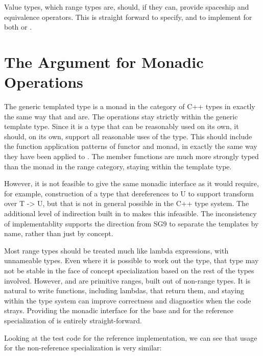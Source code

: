 \documentclass[a4paper,10pt,oneside,openany,final,article]{memoir}
\begin{document}
Value types, which range types are, should, if they can, provide spaceship and equivalence operators. This is straight forward to specify, and to implement for both  or .

\section{The Argument for Monadic Operations}
The generic templated type  is a monad in the category of C++ types in exactly the same way that  and  are. \cite{P0798R8} The operations stay strictly within the generic template type. Since it is a type that can be reasonably used on its own, it should, on its own, support all reasonable uses of the type. This should include the function application patterns of functor and monad, in exactly the same way they have been applied to . The member functions are much more strongly typed than the monad in the range category, staying within the template type.

However, it is not feasible to give  the same monadic interface as it would require, for example,  construction of a type that dereferences to U to support transform over T -> U, but that is not in general possible in the C++ type system. The additional level of indirection built in to  makes this infeasible. The inconsistency of implementablity supports the direction from SG9 to separate the templates by name, rather than just by concept.

Most range types should be treated much like lambda expressions, with unnameable types. Even where it is possible to work out the type, that type may not be stable in the face of concept specialization based on the rest of the types involved. However,  and  are primitive ranges, built out of non-range types. It is natural to write functions, including lambdas, that return them, and staying within the type system can improve correctness and diagnostics when the code strays. Providing the monadic interface for the base and for the reference specialization of  is entirely straight-forward.

Looking at the test code for the reference implementation, we can see that usage for the non-reference specialization is very similar:
\end{document}
